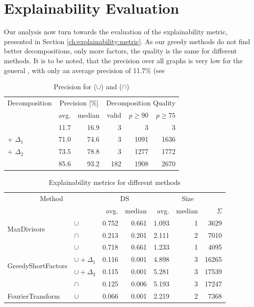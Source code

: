 \section{Explainability Evaluation}
\label{ch:Evaluation:explainability}
Our analysis now turn towards the evaluation of the explainability metric, presented in Section \ref{ch:explainability:metric}.
As our greedy methods do not find better decompositions, only more factors, the quality is the same for different methods.
It is to be noted, that the precision over all graphs is very low for the general \orDecomp, with only an average precision of 11.7\% (see 
\begin{table}[h]
	\centering
	\begin{tabular}{l|rr|rrr}
		\multicolumn{1}{c}{Decomposition} & \multicolumn{2}{c}{Precision [\%]} & \multicolumn{3}{c}{Decomposition Quality} \\
		& avg. & median & valid & $p \geq 90$ & $p \geq 75$ \\
		\hline
		\orDecomp & 11.7 & 16.9 & 3 & 3 & 3 \\
		\orDecomp + $\Delta_1$ & 71.0 & 74.6 & 3 & 1091 & 1636 \\
		\orDecomp + $\Delta_2$ & 73.5 & 78.8 & 3 & 1277 & 1772 \\
		\andDecomp & 85.6 & 93.2 &  182 & 1908 & 2670\\
	\end{tabular}
	\caption{Precision for \orDecomp ($\cup$) and \andDecomp ($\cap$)}
	\label{tab:eval-precision}
\end{table}
\begin{table}[t]
	\centering
	\begin{tabular}{ll|rr|rrr}
		\multicolumn{2}{c}{Method} &  \multicolumn{2}{c}{DS} & \multicolumn{3}{c}{Size}  \\
		& & avg. & median & avg. & median & $\Sigma$ \\
		\hline
		\multirow{2}{*}{MaxDivisors} 
		& $\cup$ & 0.752 & 0.661 &  1.093 & 1 & 3629 \\
		& $\cap$ & 0.213 & 0.201  & 2.111 & 2 & 7010 \\
		\hline
		\multirow{4}{*}{GreedyShortFactors}
		& $\cup$ & 0.718 & 0.661  & 1.233 & 1 & 4095\\
		& $\cup + \Delta_1$ & 0.116 & 0.001   & 4.898 & 3& 16265\\
		& $\cup + \Delta_2$ & 0.115 & 0.001   & 5.281 & 3& 17539\\
		& $\cap$  & 0.125 & 0.006 & 5.193 & 3  & 17247\\
		\hline
		FourierTransform & $\cup$ & 0.066 & 0.001 & 2.219 & 2  & 7368\\
	\end{tabular}
	\caption{Explainability metrics for different methods}
	\label{tab:eval-metric}
\end{table}
